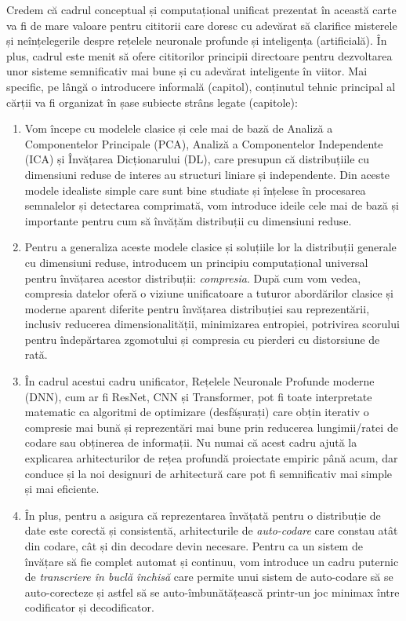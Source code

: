 \documentclass[../../book-main_ro.tex]{subfiles}
\begin{document}
Credem că cadrul conceptual și computațional unificat prezentat în această carte va fi de mare valoare pentru cititorii care doresc cu adevărat să clarifice misterele și neînțelegerile despre rețelele neuronale profunde și inteligența (artificială). În plus, cadrul este menit să ofere cititorilor principii directoare pentru dezvoltarea unor sisteme semnificativ mai bune și cu adevărat inteligente în viitor. Mai specific, pe lângă o introducere informală (capitol), conținutul tehnic principal al cărții va fi organizat în șase subiecte strâns legate (capitole):
\begin{enumerate}
\item Vom începe cu modelele clasice și cele mai de bază de Analiză a Componentelor Principale (PCA), Analiză a Componentelor Independente (ICA) și Învățarea Dicționarului (DL), care presupun că distribuțiile cu dimensiuni reduse de interes au structuri liniare și independente. Din aceste modele idealiste simple care sunt bine studiate și înțelese în procesarea semnalelor și detectarea comprimată, vom introduce ideile cele mai de bază și importante pentru cum să învățăm distribuții cu dimensiuni reduse.

\item Pentru a generaliza aceste modele clasice și soluțiile lor la distribuții generale cu dimensiuni reduse, introducem un principiu computațional universal pentru învățarea acestor distribuții: {\em compresia}. După cum vom vedea, compresia datelor oferă o viziune unificatoare a tuturor abordărilor clasice și moderne aparent diferite pentru învățarea distribuției sau reprezentării, inclusiv reducerea dimensionalității, minimizarea entropiei, potrivirea scorului pentru îndepărtarea zgomotului și compresia cu pierderi cu distorsiune de rată.

\item În cadrul acestui cadru unificator, Rețelele Neuronale Profunde moderne (DNN), cum ar fi ResNet, CNN și Transformer, pot fi toate interpretate matematic ca algoritmi de optimizare (desfășurați) care obțin iterativ o compresie mai bună și reprezentări mai bune prin reducerea lungimii/ratei de codare sau obținerea de informații. Nu numai că acest cadru ajută la explicarea arhitecturilor de rețea profundă proiectate empiric până acum, dar conduce și la noi designuri de arhitectură care pot fi semnificativ mai simple și mai eficiente.

\item În plus, pentru a asigura că reprezentarea învățată pentru o distribuție de date este corectă și consistentă, arhitecturile de {\em auto-codare} care constau atât din codare, cât și din decodare devin necesare. Pentru ca un sistem de învățare să fie complet automat și continuu, vom introduce un cadru puternic de {\em transcriere în buclă închisă} care permite unui sistem de auto-codare să se auto-corecteze și astfel să se auto-îmbunătățească printr-un joc minimax între codificator și decodificator.


\end{enumerate}
\end{document}
